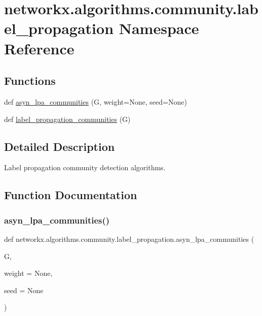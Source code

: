 \hypertarget{namespacenetworkx_1_1algorithms_1_1community_1_1label__propagation}{}\section{networkx.\+algorithms.\+community.\+label\+\_\+propagation Namespace Reference}
\label{namespacenetworkx_1_1algorithms_1_1community_1_1label__propagation}
\subsection*{Functions}
\begin{DoxyCompactItemize}
\item 
def \hyperlink{namespacenetworkx_1_1algorithms_1_1community_1_1label__propagation_af2ed355bbe10ee1875d3e8dfc7cad7bd}{asyn\+\_\+lpa\+\_\+communities} (G, weight=None, seed=None)
\item 
def \hyperlink{namespacenetworkx_1_1algorithms_1_1community_1_1label__propagation_ac94ecb9149d068f63dc5ce1f53a53567}{label\+\_\+propagation\+\_\+communities} (G)
\end{DoxyCompactItemize}


\subsection{Detailed Description}
\begin{DoxyVerb}Label propagation community detection algorithms.
\end{DoxyVerb}
 

\subsection{Function Documentation}
\mbox{\label{namespacenetworkx_1_1algorithms_1_1community_1_1label__propagation_af2ed355bbe10ee1875d3e8dfc7cad7bd}} 
\subsubsection{\texorpdfstring{asyn\+\_\+lpa\+\_\+communities()}{asyn\_lpa\_communities()}}
{\footnotesize\ttfamily def networkx.\+algorithms.\+community.\+label\+\_\+propagation.\+asyn\+\_\+lpa\+\_\+communities (\begin{DoxyParamCaption}\item[{}]{G,  }\item[{}]{weight = {\ttfamily None},  }\item[{}]{seed = {\ttfamily None} }\end{DoxyParamCaption})}

